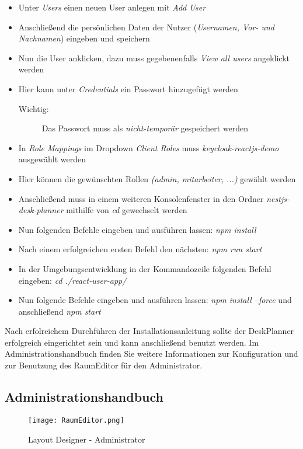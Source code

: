 \begin{itemize}
    \item   Unter \textit{Users} einen neuen User anlegen mit \textit{Add User}
    \item   Anschließend die persönlichen Daten der Nutzer (\textit{Usernamen, Vor- und Nachnamen}) eingeben und speichern
    \item   Nun die User anklicken, dazu muss gegebenenfalls \textit{View all users} angeklickt werden
    \item   Hier kann unter \textit{Credentials} ein Passwort hinzugefügt werden
    \begin{description}
    \item[Wichtig:] Das Passwort muss als \textit{nicht-temporär} gespeichert werden
    \end{description}
    \item   In \textit{Role Mappings} im Dropdown \textit{Client Roles} muss \textit{keycloak-reactjs-demo} ausgewählt werden
    \item   Hier können die gewünschten Rollen \textit{(admin, mitarbeiter, ...)} gewählt werden
    \item   Anschließend muss in einem weiteren Konsolenfenster in den Ordner \textit{nestjs-desk-planner} mithilfe von \textit{cd} gewechselt werden
    \item   Nun folgenden Befehle eingeben und ausführen lassen: \textit{npm install}
    \item   Nach einem erfolgreichen ersten Befehl den nächsten: \textit{npm run start}
    \item   In der Umgebungsentwicklung in der Kommandozeile folgenden Befehl eingeben: \textit{cd ./react-user-app/}
    \item   Nun folgende Befehle eingeben und ausführen lassen: \textit{npm install --force} und anschließend \textit{npm start}
\end{itemize}

Nach erfolreichem Durchführen der Installationsanleitung sollte der DeskPlanner erfolgreich eingerichtet sein und kann anschließend benutzt werden.
Im Administrationshandbuch finden Sie weitere Informationen zur Konfiguration und zur Benutzung des RaumEditor für den Administrator.
\subsection{Administrationshandbuch}

\begin{figure}[!h]
    \centering
    \texttt{[image: RaumEditor.png]}
    \caption{Layout Designer - Administrator}
    \label{fig:LayoutDesigner}
\end{figure}

